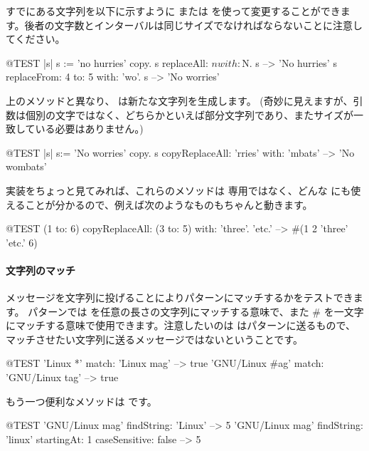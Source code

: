\documentclass[a4paper,10pt,twoside]{book}
\begin{document}
すでにある文字列を以下に示すように  または  を使って変更することができます。後者の文字数とインターバルは同じサイズでなければならないことに注意してください。

\begin{code}{@TEST |s| s := 'no hurries' copy.}
s replaceAll: $n with: $N.
s --> 'No hurries'
s replaceFrom: 4 to: 5 with: 'wo'.
s --> 'No worries'
\end{code}

上のメソッドと異なり、 は新たな文字列を生成します。
(奇妙に見えますが、引数は個別の文字ではなく、どちらかといえば部分文字列であり、またサイズが一致している必要はありません。)

\begin{code}{@TEST |s| s:= 'No worries' copy.}
s copyReplaceAll: 'rries' with: 'mbats' --> 'No wombats'
\end{code}

実装をちょっと見てみれば、これらのメソッドは  専用ではなく、どんな  にも使えることが分かるので、例えば次のようなものもちゃんと動きます。

\begin{code}{@TEST}
(1 to: 6) copyReplaceAll: (3 to: 5) with: { 'three'. 'etc.' } --> #(1 2 'three' 'etc.' 6)
\end{code}

\paragraph{文字列のマッチ}
 メッセージを文字列に投げることによりパターンにマッチするかをテストできます。
パターンでは \ct{*} を任意の長さの文字列にマッチする意味で、また \# を一文字にマッチする意味で使用できます。注意したいのは  はパターンに送るもので、マッチさせたい文字列に送るメッセージではないということです。
\begin{code}{@TEST}
'Linux *' match: 'Linux mag'                      --> true
'GNU/Linux #ag' match: 'GNU/Linux tag' --> true
\end{code}

もう一つ便利なメソッドは  です。
\begin{code}{@TEST}
'GNU/Linux mag' findString: 'Linux'                                                      --> 5
'GNU/Linux mag' findString: 'linux' startingAt: 1 caseSensitive: false  --> 5
\end{code}
\end{document}
